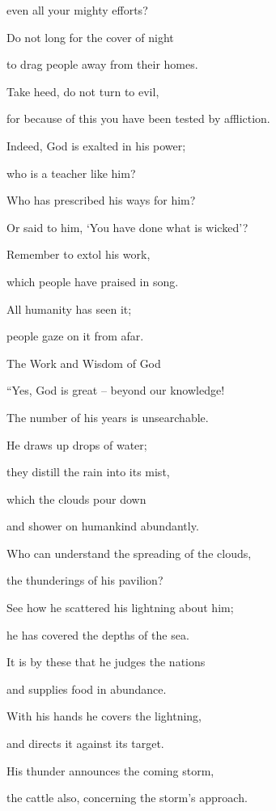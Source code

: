 {\par }{\Q even all
your mighty
efforts?
\par }{\Q {}Do not
long for the cover
of night
\par }{\Q to drag
people
away from their homes.
\par }{\Q {}Take heed,
do not
turn
to evil,
\par }{\Q for because
of this
you have
been tested
by affliction.
\par }{\Q {}Indeed,
God
is exalted
in his power;
\par }{\Q who
is a teacher
like
him?
\par }{\Q {}Who
has prescribed
his ways
for him?
\par }{\Q Or
said
to him, ‘You have done
what is wicked’?
\par }{\Q {}Remember
to extol
his work,
\par }{\Q which
people have
praised in song.
\par }{\Q {}All
humanity
has seen
it;
\par }{\Q people
gaze on
it from afar.
\par }{\SH The Work and Wisdom of God
\par }{\Q {}“Yes,
God
is great
– beyond
our knowledge!

\par }{\Q The number
of his years
is unsearchable.
\par }{\Q {}He draws
up drops
of water;
\par }{\Q they distill
the rain
into its mist,
\par }{\Q {}which
the clouds
pour
down
\par }{\Q and shower
on
humankind
abundantly.
\par }{\Q {}Who can understand
the spreading
of the clouds,
\par }{\Q the thunderings
of his pavilion?
\par }{\Q {}See
how he scattered
his lightning
about him;
\par }{\Q he has covered
the depths
of the sea.
\par }{\Q {}It is by these that
he judges
the nations
\par }{\Q and supplies
food
in abundance.
\par }{\Q {}With his hands
he covers
the lightning,
\par }{\Q and directs
it against its target.
\par }{\Q His thunder
announces
the coming storm,
\par }{\Q the cattle
also, concerning the storm’s approach.


}
